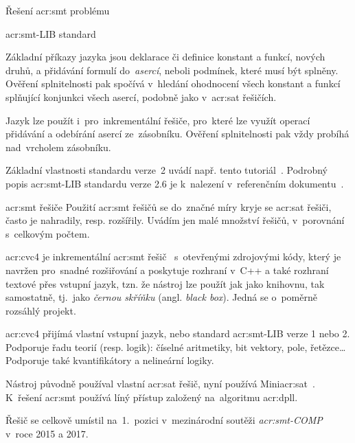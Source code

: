 \documentclass[thesis=M,czech]{FITthesis}[2012/06/26]
\newcommand{\acrlabel}[1]{acr:#1}
\newcommand{\acr}[1]{\acrshort{\acrlabel{#1}}}
\newcommand{\hl}[1]{\textit{#1}}
\newcommand{\name}[1]{\hl{#1}}
\newcommand{\cit}[1]{\cite{#1}}
\begin{document}
\begin{section}{Řešení \acr{smt} problému}
\begin{subsection}{\acr{smt}-LIB standard}
\bigskip

Základní příkazy jazyka jsou deklarace či definice konstant a funkcí,
nových druhů, a přidávání formulí do~\name{asercí},
neboli podmínek, které musí být splněny.
Ověření splnitelnosti pak spočívá v~hledání ohodnocení
všech konstant a funkcí splňující konjunkci všech asercí,
podobně jako v~\acr{sat} řešičích.

Jazyk lze použít i~pro~inkrementální řešiče,
pro~které lze využít operací přidávání a odebírání
asercí ze~zásobníku.
Ověření splnitelnosti pak vždy probíhá
nad~vrcholem zásobníku.

Základní vlastnosti standardu verze~2
uvádí např. tento tutoriál~\cit{smtlib-tutorial-art}.
Podrobný popis \acr{smt}-LIB standardu verze 2.6
je k~nalezení v~referenčním dokumentu~\cit{smtlib-reference-art}.
\end{subsection} %


\begin{subsection}{\acr{smt} řešiče}\label{ss:search:smt:solver}
Použití \acr{smt} řešičů se do~značné míry kryje se \acr{sat} řešiči,
často je nahradily, resp. rozšířily.
Uvádím jen malé množství řešičů,
v~porovnání s~celkovým počtem.


\begin{paragraph}{\acr{cvc}4}\label{p:search:smt:solver:cvc4}
je inkrementální \acr{smt} řešič~\cit{cvc4}\cit{cvc4-art}
s~otevřenými zdrojovými kódy,
který je navržen pro~snadné rozšiřování
a poskytuje rozhraní v~C++
a také rozhraní textové přes vstupní jazyk,
tzn. že nástroj lze použít jak jako knihovnu,
tak samostatně,
tj.~jako \name{černou skříňku} (angl. \name{black box}).
Jedná se o~poměrně rozsáhlý projekt.

\acr{cvc}4 přijímá vlastní vstupní jazyk,
nebo standard \acr{smt}-LIB verze 1 nebo 2.
Podporuje řadu teorií (resp. logik):
číselné aritmetiky, bit vektory, pole, řetězce\dots
Podporuje také kvantifikátory
a nelineární logiky.

Nástroj původně používal vlastní \acr{sat} řešič,
nyní používá Mini\acr{sat}~\cit{cvc4-art}.
K~řešení \acr{smt} používá líný přístup
založený na~algoritmu \acr{dpll}.

Řešič se celkově umístil na~1.~pozici
v~mezinárodní soutěži
\name{\acr{smt}-COMP}~\cit{smtcomp}\cit{smtcomp-art}
v~roce 2015 a 2017.
\end{paragraph} %


\end{subsection}
\end{section}
\end{document}
